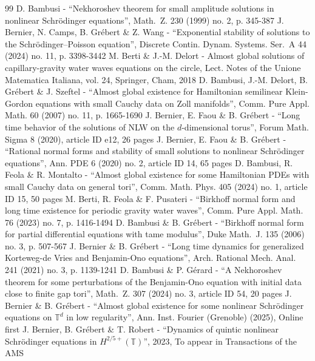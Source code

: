 \begin{thebibliography}{99}
 D. Bambusi - “Nekhoroshev theorem for small amplitude solutions in nonlinear Schrödinger equations”, Math. Z. 230 (1999) no. 2, p. 345-387
 J. Bernier, N. Camps, B. Grébert \& Z. Wang - “Exponential stability of solutions to the Schrödinger–Poisson equation”, Discrete Contin. Dynam. Systems. Ser. A 44 (2024) no. 11, p. 3398-3442
 M. Berti \& J.-M. Delort - Almost global solutions of capillary-gravity water waves equations on the circle, Lect. Notes of the Unione Matematica Italiana, vol. 24, Springer, Cham, 2018
 D. Bambusi, J.-M. Delort, B. Grébert \& J. Szeftel - “Almost global existence for Hamiltonian semilinear Klein-Gordon equations with small Cauchy data on Zoll manifolds”, Comm. Pure Appl. Math. 60 (2007) no. 11, p. 1665-1690
 J. Bernier, E. Faou \& B. Grébert - “Long time behavior of the solutions of NLW on the $d$-dimensional torus”, Forum Math. Sigma 8 (2020), article ID e12, 26 pages
 J. Bernier, E. Faou \& B. Grébert - “Rational normal forms and stability of small solutions to nonlinear Schrödinger equations”, Ann. PDE 6 (2020) no. 2, article ID 14, 65 pages
 D. Bambusi, R. Feola \& R. Montalto - “Almost global existence for some Hamiltonian PDEs with small Cauchy data on general tori”, Comm. Math. Phys. 405 (2024) no. 1, article ID 15, 50 pages
 M. Berti, R. Feola \& F. Pusateri - “Birkhoff normal form and long time existence for periodic gravity water waves”, Comm. Pure Appl. Math. 76 (2023) no. 7, p. 1416-1494
 D. Bambusi \& B. Grébert - “Birkhoff normal form for partial differential equations with tame modulus”, Duke Math. J. 135 (2006) no. 3, p. 507-567
 J. Bernier \& B. Grébert - “Long time dynamics for generalized Korteweg-de Vries and Benjamin-Ono equations”, Arch. Rational Mech. Anal. 241 (2021) no. 3, p. 1139-1241
 D. Bambusi \& P. Gérard - “A Nekhoroshev theorem for some perturbations of the Benjamin-Ono equation with initial data close to finite gap tori”, Math. Z. 307 (2024) no. 3, article ID 54, 20 pages
 J. Bernier \& B. Grébert - “Almost global existence for some nonlinear Schrödinger equations on $\mathbb{T}^d$ in low regularity”, Ann. Inst. Fourier (Grenoble) (2025), Online first
 J. Bernier, B. Grébert \& T. Robert - “Dynamics of quintic nonlinear Schrödinger equations in $H^{2/5+}(\mathbb{T})$”, 2023, To appear in Transactions of the AMS

\end{thebibliography}

